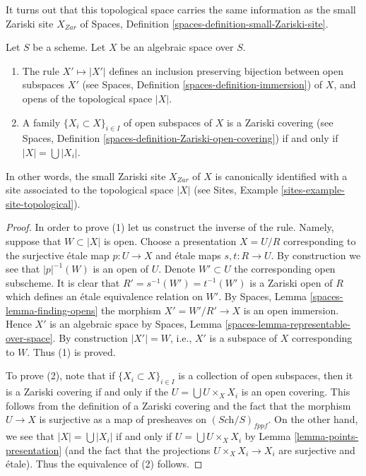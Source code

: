 \noindent
It turns out that this topological space carries the same information
as the small Zariski site $X_{Zar}$ of
Spaces, Definition \ref{spaces-definition-small-Zariski-site}.

\begin{lemma}
\label{lemma-open-subspaces}
Let $S$ be a scheme.
Let $X$ be an algebraic space over $S$.
\begin{enumerate}
\item The rule $X' \mapsto |X'|$ defines an inclusion preserving
bijection between open subspaces $X'$ (see
Spaces, Definition \ref{spaces-definition-immersion})
of $X$, and opens of the topological space $|X|$.
\item A family $\{X_i \subset X\}_{i \in I}$ of open subspaces of $X$
is a Zariski covering (see
Spaces, Definition \ref{spaces-definition-Zariski-open-covering})
if and only if $|X| = \bigcup |X_i|$.
\end{enumerate}
In other words, the small Zariski site $X_{Zar}$ of $X$ is canonically
identified with a site associated to the topological space $|X|$ (see
Sites, Example \ref{sites-example-site-topological}).
\end{lemma}

\begin{proof}
In order to prove (1) let us construct the inverse of the rule.
Namely, suppose that $W \subset |X|$ is open. Choose a presentation
$X = U/R$ corresponding to the surjective \'etale map
$p : U \to X$ and \'etale maps $s, t : R \to U$.
By construction we see that $|p|^{-1}(W)$ is an
open of $U$. Denote $W' \subset U$ the corresponding open subscheme.
It is clear that $R' = s^{-1}(W') = t^{-1}(W')$ is a Zariski open
of $R$ which defines an \'etale equivalence relation on $W'$.
By Spaces, Lemma \ref{spaces-lemma-finding-opens} the morphism
$X' = W'/R' \to X$ is an open immersion. Hence $X'$ is an algebraic space
by Spaces, Lemma \ref{spaces-lemma-representable-over-space}.
By construction $|X'| = W$, i.e., $X'$ is a subspace of $X$
corresponding to $W$. Thus (1) is proved.

\medskip\noindent
To prove (2), note that if $\{X_i \subset X\}_{i \in I}$ is a collection
of open subspaces, then it is a Zariski covering if and only if the
$U = \bigcup U \times_X X_i$ is an open covering. This follows from
the definition of a Zariski covering and the fact that the morphism
$U \to X$ is surjective as a map of presheaves on $(\textit{Sch}/S)_{fppf}$.
On the other hand, we see that $|X| = \bigcup |X_i|$ if and only if
$U = \bigcup U \times_X X_i$ by Lemma \ref{lemma-points-presentation}
(and the fact that the projections $U \times_X X_i \to X_i$ are surjective
and \'etale). Thus the equivalence of (2) follows.
\end{proof}

